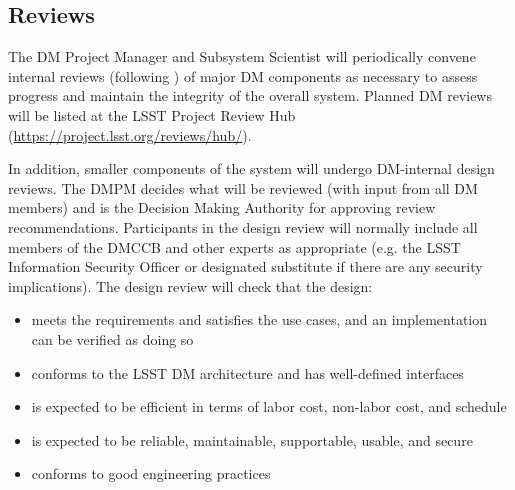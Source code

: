 \subsection{Reviews} \label{sect:reviews}

The \gls{DM} \gls{Project Manager} and \gls{Subsystem Scientist} will periodically convene internal reviews (following )
of major \gls{DM} components as necessary to assess progress and maintain the integrity of the overall system. Planned \gls{DM} reviews will be listed at the \gls{LSST} Project \gls{Review Hub} (\url{https://project.lsst.org/reviews/hub/}).


In addition, smaller components of the system will undergo DM-internal design reviews.  The \gls{DMPM} decides what will be reviewed (with input from all DM members) and is the Decision Making Authority for approving review recommendations.  Participants in the design review will normally include all members of the \gls{DMCCB} and other experts as appropriate (e.g. the \gls{LSST} Information Security Officer or designated substitute if there are any security implications).  The design review will check that the design:
\begin{itemize}
\item meets the requirements and satisfies the use cases, and an implementation can be verified as doing so
\item conforms to the \gls{LSST} \gls{DM} architecture and has well-defined interfaces
\item is expected to be efficient in terms of labor cost, non-labor cost, and schedule
\item is expected to be reliable, maintainable, supportable, usable, and secure
\item conforms to good engineering practices
\end{itemize}

